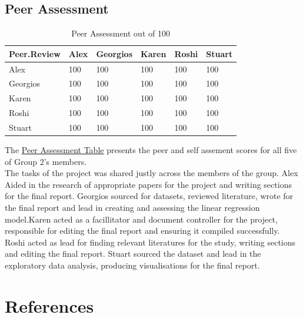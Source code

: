 \documentclass[10pt]{article}\usepackage[]{graphicx}\usepackage[]{color}
\begin{document}
\subsection{Peer Assessment}


\begin{table}[H]
\centering
\caption{Peer Assessment out of 100} 
\label{tab:two}
\begin{tabular}{llllll}
  \hline
Peer.Review & Alex & Georgios & Karen & Roshi & Stuart \\ 
  \hline
Alex & 100 & 100 & 100 & 100 & 100 \\ 
  Georgios & 100 & 100 & 100 & 100 & 100 \\ 
  Karen & 100 & 100 & 100 & 100 & 100 \\ 
  Roshi & 100 & 100 & 100 & 100 & 100 \\ 
  Stuart & 100 & 100 & 100 & 100 & 100 \\ 
   \hline
\end{tabular}
\end{table}


The \hyperref[tab:two]{Peer Assessment Table} presents the peer and self assement scores for all five of Group 2's members.\\

The tasks of the project was shared justly across the members of the group. Alex Aided in the research of appropriate papers for the project and writing sections for the final report. Georgios sourced for datasets, reviewed literature, wrote for the final report and lead in creating and assessing the linear regression model.Karen acted as a facillitator and document controller for the project, responsible for editing the final report and ensuring it compiled successfully. Roshi acted as lead for finding relevant literatures for the study, writing sections and editing the final report. Stuart sourced the dataset and lead in the exploratory data analysis, producing visualisations for the final report.\\


\pagebreak
\section*{References}\label{pubs}
\printbibliography[heading=none]
\end{document}
